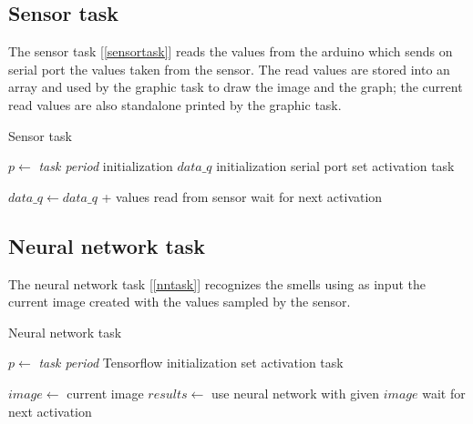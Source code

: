 \documentclass[12pt]{article}
\begin{document}
\subsection{Sensor task}
The sensor task [\ref{sensortask}] reads the values from the arduino which
sends on serial port the values taken from the sensor. The read values are
stored into an array and used by the graphic task to draw the image and the
graph; the current read values are also standalone printed by the graphic
task.

\begin{algorithm}[H]
\caption{Sensor task}
\label{sensortask}

\begin{algorithmic}
\State $p\gets$ \textit{task period}
\State initialization $data\_q$
\State initialization serial port
\State set activation task

\Loop
\State $data\_q\gets data\_q$ + values read from sensor
\State wait for next activation
\EndLoop

\end{algorithmic}
\end{algorithm}

\subsection{Neural network task}
The neural network task [\ref{nntask}] recognizes the smells using as input the
current image created with the values sampled by the sensor.

\begin{algorithm}[H]
\caption{Neural network task}
\label{nntask}

\begin{algorithmic}
\State $p\gets$ \textit{task period}
\State Tensorflow initialization
\State set activation task

\Loop
\State $image\gets$ current image
\State $results\gets$ use neural network with given $image$
\State wait for next activation
\EndLoop

\end{algorithmic}
\end{algorithm}
\end{document}
